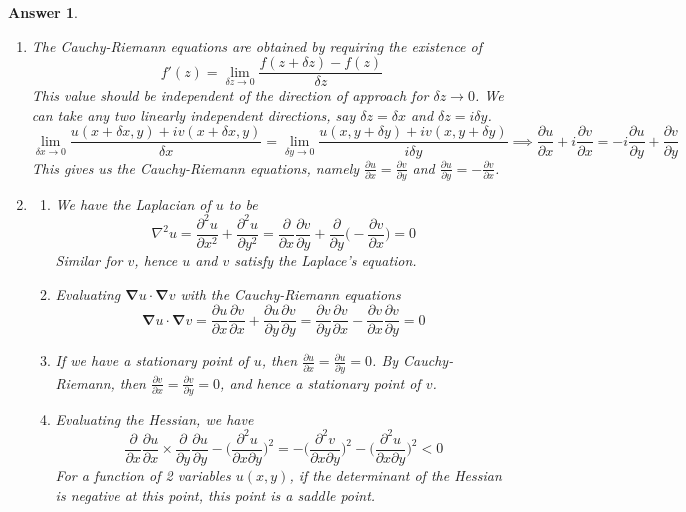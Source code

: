 \documentclass[a4paper]{article}
\newtheorem{ans}{Answer}[section]
\theoremstyle{new}
\begin{document}
\begin{ans}\leavevmode
\begin{enumerate}[label=(\alph*)]
\item The Cauchy-Riemann equations are obtained by requiring the existence of $$f'(z)=\lim_{\delta z\rightarrow0}\frac{f(z+\delta z)-f(z)}{\delta z}$$ This value should be independent of the direction of approach for $\delta z\rightarrow 0$. We can take any two linearly independent directions, say $\delta z=\delta x$ and $\delta z=i\delta y$. 
$$\lim_{\delta x\rightarrow0}\frac{u(x+\delta x,y)+iv(x+\delta x,y)}{\delta x}=\lim_{\delta y\rightarrow0}\frac{u(x,y+\delta y)+iv(x,y+\delta y)}{i\delta y}\implies\frac{\partial u}{\partial x}+i\frac{\partial v}{\partial x}=-i\frac{\partial u}{\partial y}+\frac{\partial v}{\partial y}$$
This gives us the Cauchy-Riemann equations, namely $\frac{\partial u}{\partial x}=\frac{\partial v}{\partial y}$ and $\frac{\partial u}{\partial y}=-\frac{\partial v}{\partial x}$.
\item
\begin{enumerate}[label=(\roman*)]
\item We have the Laplacian of $u$ to be
$$\nabla^2u=\frac{\partial^2u}{\partial x^2}+\frac{\partial^2u}{\partial y^2}=\frac{\partial}{\partial x}\frac{\partial v}{\partial y}+\frac{\partial}{\partial y}\bigg(-\frac{\partial v}{\partial x}\bigg)=0$$
Similar for $v$, hence $u$ and $v$ satisfy the Laplace's equation.
\item Evaluating $\boldsymbol{\nabla}u\cdot\boldsymbol{\nabla}v$ with the Cauchy-Riemann equations
$$\boldsymbol{\nabla}u\cdot\boldsymbol{\nabla}v=\frac{\partial u}{\partial x}\frac{\partial v}{\partial x}+\frac{\partial u}{\partial y}\frac{\partial v}{\partial y}=\frac{\partial v}{\partial y}\frac{\partial v}{\partial x}-\frac{\partial v}{\partial x}\frac{\partial v}{\partial y}=0$$
\item If we have a stationary point of $u$, then $\frac{\partial u}{\partial x}=\frac{\partial u}{\partial y}=0$. By Cauchy-Riemann, then $\frac{\partial v}{\partial x}=\frac{\partial v}{\partial y}=0$, and hence a stationary point of $v$.
\item Evaluating the Hessian, we have
$$\frac{\partial}{\partial x}\frac{\partial u}{\partial x}\times\frac{\partial}{\partial y}\frac{\partial u}{\partial y}-\bigg(\frac{\partial^2u}{\partial x\partial y}\bigg)^2=-\bigg(\frac{\partial^2v}{\partial x\partial y}\bigg)^2-\bigg(\frac{\partial^2u}{\partial x\partial y}\bigg)^2<0$$
For a function of 2 variables $u(x,y)$, if the determinant of the Hessian is negative at this point, this point is a saddle point.

\end{enumerate}
\end{enumerate}
\end{ans}
\end{document}
